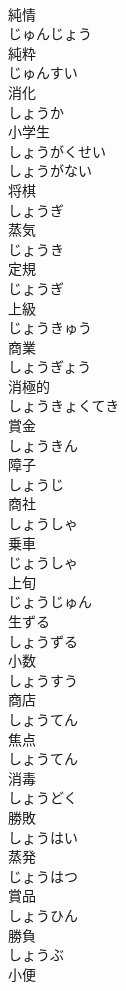 \documentclass[8pt]{extreport}
\begin{document}
\begin{CJK}{UTF8}{min}
\\	純情 
\\	じゅんじょう	
\\	純粋 
\\	じゅんすい	
\\	消化 
\\	しょうか	
\\	小学生 
\\	しょうがくせい	
\\	しょうがない	
\\	将棋 
\\	しょうぎ	
\\	蒸気 
\\	じょうき	
\\	定規 
\\	じょうぎ	
\\	上級 
\\	じょうきゅう	
\\	商業 
\\	しょうぎょう	
\\	消極的 
\\	しょうきょくてき	
\\	賞金 
\\	しょうきん	
\\	障子 
\\	しょうじ	
\\	商社 
\\	しょうしゃ	
\\	乗車 
\\	じょうしゃ	
\\	上旬 
\\	じょうじゅん	
\\	生ずる 
\\	しょうずる	
\\	小数 
\\	しょうすう	
\\	商店 
\\	しょうてん	
\\	焦点 
\\	しょうてん	
\\	消毒 
\\	しょうどく	
\\	勝敗 
\\	しょうはい	
\\	蒸発 
\\	じょうはつ	
\\	賞品 
\\	しょうひん	
\\	勝負 
\\	しょうぶ	
\\	小便 

\end{CJK}
\end{document}
